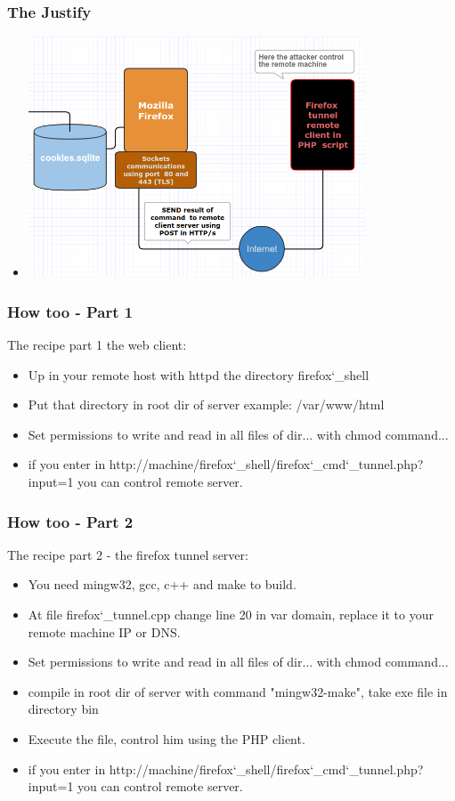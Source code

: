 \documentclass[serif,mathserif]{beamer}
\begin{document}
\begin{frame}
  \frametitle{The Justify}
  \begin{itemize}
  \item \includegraphics[width=10.0cm]{img/tunnel8.png}
  \end{itemize}
\end{frame}

\begin{frame}
  \frametitle{How too -  Part 1}
  The recipe part 1 the web client:\pause
  \begin{itemize}
  \item Up in your remote host with httpd the directory firefox\char`_shell \pause
  \item Put that directory in root dir of server  example: /var/www/html \pause
  \item Set permissions to write and read in all files of dir... with chmod command...\pause
  \item if you enter in http://machine/firefox\char`_shell/firefox\char`_cmd\char`_tunnel.php?input=1 you can control remote server. %
  \end{itemize}
\end{frame}

\begin{frame}
  \frametitle{How too -  Part 2}
  The recipe part 2 - the firefox tunnel server:\pause
  \begin{itemize}
  \item You need mingw32, gcc, c++ and make to build.\pause
  \item At file firefox\char`_tunnel.cpp change line 20 in var domain, replace it to your remote machine IP or DNS. \pause
  \item Set permissions to write and read in all files of dir... with chmod command...\pause
  \item compile in root dir of server with command "mingw32-make", take exe file in directory bin \pause
  \item Execute the file, control him  using the PHP client. \pause
  \item if you enter in http://machine/firefox\char`_shell/firefox\char`_cmd\char`_tunnel.php?input=1 you can control remote  server.  
  \end{itemize}
\end{frame}
\end{document}
